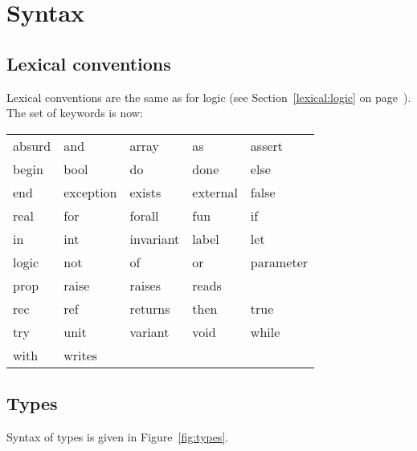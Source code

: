 \documentclass[a4paper,12pt]{report}
\begin{document}
\section{Syntax}
\label{syntax}

\subsection{Lexical conventions}
\label{lexical}

Lexical conventions are the same as for logic (see
Section~\ref{lexical:logic} on page~\pageref{lexical:logic}).
The set of keywords is now:
\begin{center}
{\tt\begin{tabular}{l@{\qquad}l@{\qquad}l@{\qquad}l@{\qquad}l}
absurd & and & array & as & assert  \\
begin & bool & do & done & else  \\
end & exception & exists & external & false  \\
real & for & forall & fun & if  \\
in & int & invariant & label & let  \\
logic & not & of & or & parameter \\
prop & raise & raises & reads \\
rec & ref & returns & then & true \\
try & unit & variant & void & while \\
with & writes
\end{tabular}}
\end{center}

\subsection{Types}
\label{syntax:types}

Syntax of types is given in Figure~\ref{fig:types}.
\end{document}
